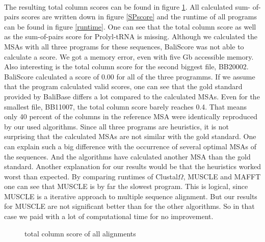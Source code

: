 \documentclass[%
   10pt,              %
   nenglish,           %
   a4paper,           %
   DIV11,             %
]{scrartcl}%
\begin{document}
\\
\noindent The resulting total column scores can be found in figure \ref{totCol}. All calculated sum-
of-pairs scores are written down in figure \ref{SPscore} and the runtime of all programs can be found 
in figure \ref{runtime}. One can see that the total column score as well as the sum-of-pairs 
score for Prolyl-tRNA is missing. Although we calculated the MSAs with all three programs for these 
sequences, BaliScore was not able to calculate a score. We got a memory error, even with five Gb 
accessible memory. Also interesting is the total column score for the second biggest file, BB20002. 
BaliScore calculated a score of 0.00 for all of the three programms. If we assume that the 
program calculated valid scores, one can see that the gold standard provided by BaliBase differs 
a lot compared to the calculated MSAs. Even for the smallest file, BB11007, the total column score 
barely reaches 0.4. That means only 40 percent of the columns in the reference MSA were identically 
reproduced by our used algorithms. Since all three programs are heuristics, it is not surprising 
that the calculated MSAs are not similar with the gold standard. One can explain such a big difference 
with the occurrence of several optimal MSAs of the sequences. And the algorithms have calculated 
another MSA than the gold standard. Another explanation for our results would be that the heuristics 
worked worst than expected. By comparing runtimes of Clustal$\Omega$, MUSCLE and MAFFT one can see 
that MUSCLE is by far the slowest program. This is logical, since MUSCLE is a iterative approach to 
multiple sequence alignment. But our results for MUSCLE are not significant better than for the other 
algorithms. So in that case we paid with a lot of computational time for no improvement.


\begin{figure}[ht]
 \centering
 \caption{total column score of all alignments}
 \label{totCol}
\end{figure}
\end{document}
